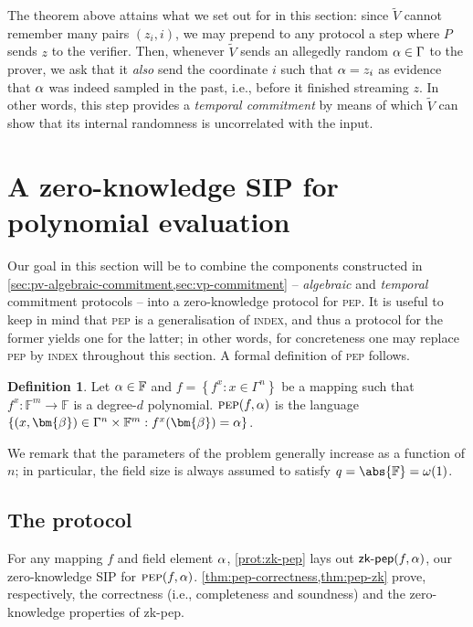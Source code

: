 \documentclass[10pt,a4paper]{article}
\theoremstyle{definition}
\newtheorem{definition}[theorem]{Definition}
\newcommand{\field}{\mathbb{F}}
\renewcommand{\set}[1]{\left\{#1\right\}}
\newcommand{\indexproblem}{\normalfont\textsc{index}\xspace}
\newcommand{\pep}{\normalfont\textsc{pep}\xspace}
\newcommand{\vcommitstring}{z}
\newcommand{\dimension}{m}
\newcommand{\degree}{d}
\newcommand{\fieldsize}{q}
\newcommand{\evaluationpoint}{\bm{\fe2}}
\newcommand{\alphabet}{\Gamma}
\def\symbol#1{
    \ifnum#1=1
        \alpha
    \else
    \ifnum#1=2
        \beta
    \else
    \ifnum#1=3
        \gamma
    \fi\fi\fi
}
\def\fe#1{
    \ifnum#1=1
        \alpha
    \else
    \ifnum#1=2
        \beta
    \else
    \ifnum#1=3
        \gamma
    \fi\fi\fi
}
\begin{document}
The theorem above attains what we set out for in this section: since $\widetilde V$ cannot remember many pairs $(\vcommitstring_i, i)$, we may prepend to any protocol a step where $P$ sends $\vcommitstring$ to the verifier. Then, whenever $\widetilde V$ sends an allegedly random $\symbol1 \in \alphabet$ to the prover, we ask that it \emph{also} send the coordinate $i$ such that $\symbol1 = \vcommitstring_i$ as evidence that $\symbol1$ was indeed sampled in the past, i.e., before it finished streaming $\vcommitstring$. In other words, this step provides a \emph{temporal commitment} by means of which $\widetilde V$ can show that its internal randomness is uncorrelated with the input. 

\section{A zero-knowledge SIP for polynomial evaluation}
\label{sec:pep}

Our goal in this section will be to combine the components constructed in \cref{sec:pv-algebraic-commitment,sec:vp-commitment} -- \emph{algebraic} and \emph{temporal} commitment protocols -- into a zero-knowledge protocol for \pep. It is useful to keep in mind that \pep is a generalisation of \indexproblem, and thus a protocol for the former yields one for the latter; in other words, for concreteness one may replace \pep by \indexproblem throughout this section. A formal definition of \pep follows.

\begin{definition}
    \label{def:pep}
    Let $\fe1 \in \field$ and $f = \set{f^x : x \in \alphabet^n}$ be a mapping such that $f^x: \field^\dimension \to \field$ is a degree-$\degree$ polynomial. $\pep(f, \fe1)$ is the language $\set{(x, \evaluationpoint) \in \alphabet^n \times \field^\dimension : f^x(\evaluationpoint) = \fe1}$.
\end{definition}
We remark that the parameters of the problem generally increase as a function of $n$; in particular, the field size is always assumed to satisfy $\fieldsize = \abs{\field} = \omega(1)$.

\subsection{The protocol}

For any mapping $f$ and field element $\fe1$, \cref{prot:zk-pep} lays out $\textsf{zk-pep}(f, \fe1)$, our zero-knowledge SIP for $\pep(f, \fe1)$. \cref{thm:pep-correctness,thm:pep-zk} prove, respectively, the correctness (i.e., completeness and soundness) and the zero-knowledge properties of \textsf{zk-pep}.
\end{document}
